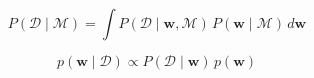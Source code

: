






\begin{equation}
P(\mathcal{D} \mid \mathcal{M}) 
= \int P(\mathcal{D} \mid \mathbf{w}, \mathcal{M}) \,
      P(\mathbf{w} \mid \mathcal{M}) \, d\mathbf{w}
\label{eq:evidence}
\end{equation}

\begin{equation}
p(\mathbf{w} \mid \mathcal{D}) \propto 
   P(\mathcal{D} \mid \mathbf{w}) \, p(\mathbf{w})
\label{eq:posterior}
\end{equation}


